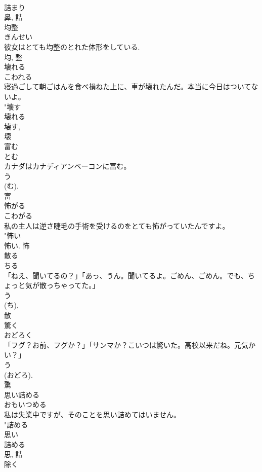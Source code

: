 \documentclass[8pt]{extreport}
\begin{document}
\begin{CJK}{UTF8}{min}
\\	詰まり 
\\	鼻, 詰	
\\	均整	
\\	きんせい	
\\	彼女はとても均整のとれた体形をしている.	
\\	均, 整	
\\	壊れる	
\\	こわれる	
\\	寝過ごして朝ごはんを食べ損ねた上に、車が壊れたんだ。本当に今日はついてないよ。	
\\	"壊す 
\\	壊れる 
\\	壊す, 
\\	壊	
\\	富む	
\\	とむ	
\\	カナダはカナディアンベーコンに富む。	
\\	う 
\\	(む). 
\\	富	
\\	怖がる	
\\	こわがる	
\\	私の主人は逆さ睫毛の手術を受けるのをとても怖がっていたんですよ。	
\\	"怖い 
\\	怖い.	怖	
\\	散る	
\\	ちる	
\\	「ねえ、聞いてるの？」「あっ、うん。聞いてるよ。ごめん、ごめん。でも、ちょっと気が散っちゃってた。」	
\\	う 
\\	(ち), 
\\	散	
\\	驚く	
\\	おどろく	
\\	「フグ？お前、フグか？」「サンマか？こいつは驚いた。高校以来だね。元気かい？」	
\\	う 
\\	(おどろ). 
\\	驚	
\\	思い詰める	
\\	おもいつめる	
\\	私は失業中ですが、そのことを思い詰めてはいません。	
\\	"詰める 
\\	思い 
\\	詰める 
\\	思, 詰	
\\	除く	

\end{CJK}
\end{document}
